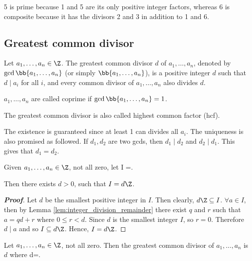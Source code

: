 \begin{example}
5 is prime because 1 and 5 are its only positive integer factors, whereas 6 is composite because it has the divisors 2 and 3 in addition to 1 and 6. 
\end{example}


\subsection{Greatest common divisor}

\begin{definition}
Let $a_1,\dots, a_n\in \Z$. The greatest common divisor $d$ of $a_1,\dots,a_n$, denoted by $\gcd\bb{a_1,\dots,a_n}$ (or simply $\bb{a_1,\dots,a_n}$), is a positive integer $d$ such that $d\mid a_i$ for all $i$, and every common divisor of $a_1,\dots, a_n$ also divides $d$.

$a_1,\dots, a_n$ are called coprime if $\gcd\bb{a_1,\dots,a_n} =1$.

The greatest common divisor is also called highest common factor (hcf).
\end{definition}

\begin{remark}
The existence is guaranteed since at least 1 can divides all $a_i$. The uniqueness is also promised as followed. If $d_1,d_2$ are two gcds, then $d_1\mid d_2$ and $d_2\mid d_1$. This gives that $d_1=d_2$.
\end{remark}

\begin{lemma}\label{lem:linear_combination_set_of_integers}
Given $a_1,\dots, a_n\in \Z$, not all zero, let 
\be
I =. 
\ee

Then there exists $d>0$, such that $I = d \Z$.
\end{lemma}

\begin{proof}[\bf Proof]
Let $d$ be the smallest positive integer in $I$. Then clearly, $d\Z \subseteq I$. $\forall a\in I$, then by Lemma \ref{lem:integer_division_remainder} there exist $q$ and $r$ such that $a = qd+r$ where $0\leq r<d$. Since $d$ is the smallest integer $I$, so $r=0$. Therefore $d\mid a$ and so $I \subseteq d\Z$. Hence, $I = d\Z$.
\end{proof}

\begin{lemma}\label{lem:linear_combination_set_gcd}
Let $a_1,\dots,a_n\in \Z$, not all zero. Then the greatest common divisor of $a_1,\dots,a_n$ is $d$ where
\be
d\Z =.
\ee
\end{lemma}

